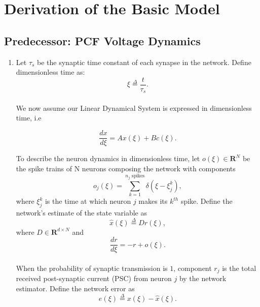\section{Derivation of the Basic Model}
\label{section:derivation:basic_model}
\subsection{Predecessor: PCF Voltage Dynamics}
\begin{enumerate}
    \item Let $\tau_s$ be the synaptic time constant of each synapse in the network. Define dimensionless time as:
    \begin{equation*}
        \xi \overset{\Delta}{=} \frac{t}{\tau_s}.
    \end{equation*}\\
    We now assume our Linear Dynamical System is expressed in dimensionless time, i.e
    
    \begin{equation}
        \label{eq:lds_dimensionless}
        \frac{dx}{d\xi} = Ax(\xi) + B c(\xi).
    \end{equation}
    
    To describe the neuron dynamics in dimensionless time, let $o(\xi) \in \mathbf{R}^{N}$ be the spike trains of N neurons composing the network with components
    \begin{equation*}
        o_j(\xi) = \sum_{k=1}^{\text{$n_j$ spikes}} \delta(\xi - \xi_{j}^{k}),
    \end{equation*}
    where $\xi_j^k$ is the time at which neuron $j$ makes its $k^{th}$ spike. 
    Define the network's estimate of the state variable as
    \begin{equation}
        \label{eq:xhat}
        \hat{x}(\xi)
        \overset{\Delta}{=} D r(\xi), 
    \end{equation}
    where $D \in \mathbf{R}^{d \times N}$ and 
    \begin{equation}
    \label{eq:rdot}
        \frac{dr}{d \xi} = -r + o(\xi).
    \end{equation}\\
    When the probability of synaptic transmission is $1$, component $r_j$ is the total received post-synaptic current (PSC) from neuron $j$ by the network estimator. 
    Define the network error as
    \begin{equation}
    \label{eq:error_def}
        e(\xi) \overset{\Delta}{=} x(\xi) - \hat{x}(\xi).
    \end{equation}
    

\end{enumerate}
